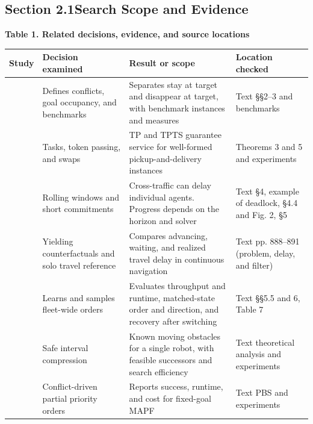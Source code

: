 \documentclass{article}
\begin{document}
\subsection*{Section 2.1\quad Search Scope and Evidence}\hypertarget{sup:2.1}{}
\par\medskip\noindent\begin{minipage}{\linewidth}
\small\hypertarget{display:Table1}{}\textbf{Table 1. Related decisions, evidence, and source locations}\par\smallskip
\setlength{\tabcolsep}{4pt}\renewcommand{\arraystretch}{1.12}
\begin{tabular}{@{}>{\raggedright\arraybackslash}p{}>{\raggedright\arraybackslash}p{}>{\raggedright\arraybackslash}p{}>{\raggedright\arraybackslash}p{}@{}}
\toprule
\textbf{Study} & \textbf{Decision examined} & \textbf{Result or scope} & \textbf{Location checked} \\
\midrule
\citet{stern2019} & Defines conflicts, goal occupancy, and benchmarks & Separates stay at target and disappear at target, with benchmark instances and measures & Text \S{}\S{}2--3 and benchmarks \\
\citet{ma2017} & Tasks, token passing, and swaps & TP and TPTS guarantee service for well-formed pickup-and-delivery instances & Theorems 3 and 5 and experiments \\
\citet{li2021} & Rolling windows and short commitments & Cross-traffic can delay individual agents. Progress depends on the horizon and solver & Text \S{}4, example of deadlock, \S{}4.4 and Fig. 2, \S{}5 \\
\citet{asano2023} & Yielding counterfactuals and solo travel reference & Compares advancing, waiting, and realized travel delay in continuous navigation & Text pp. 888--891 (problem, delay, and filter) \\
\citet{zheng2026} & Learns and samples fleet-wide orders & Evaluates throughput and runtime, matched-state order and direction, and recovery after switching & Text \S{}\S{}5.5 and 6, Table 7 \\
\citet{phillips2011} & Safe interval compression & Known moving obstacles for a single robot, with feasible successors and search efficiency & Text theoretical analysis and experiments \\
\citet{ma2019} & Conflict-driven partial priority orders & Reports success, runtime, and cost for fixed-goal MAPF & Text PBS and experiments \\

\end{tabular}
\end{minipage}
\end{document}
